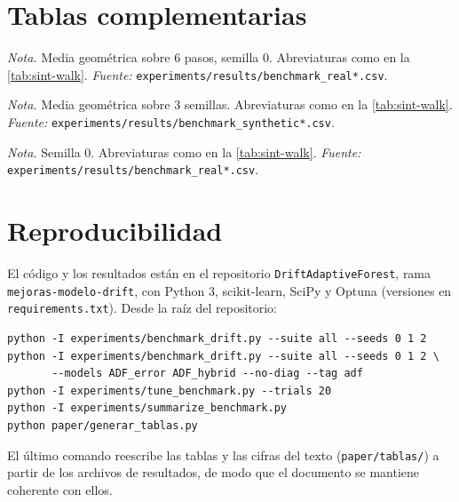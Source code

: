 \documentclass[11pt,a4paper]{article}
\newcommand{\nota}[1]{\par\smallskip\raggedright\footnotesize\textit{Nota.} #1}
\begin{document}
\printbibliography[title={Referencias}]

\appendix
\section{Tablas complementarias}\label{app:tablas}

\begin{table}[htbp]
  \centering
  \caption{Cociente de RMSE respecto al RF convencional, datos reales, walk-forward}\label{tab:real-walk}
  \small
  
  \nota{Media geométrica sobre 6 pasos, semilla 0. Abreviaturas como en la \cref{tab:sint-walk}.
  \textit{Fuente:} \texttt{experiments/results/benchmark\_real*.csv}.}
\end{table}

\begin{table}[htbp]
  \centering
  \caption{Cociente de RMSE respecto al RF convencional, escenarios sintéticos, partición 80/20}\label{tab:sint-static}
  \small
  
  \nota{Media geométrica sobre 3 semillas. Abreviaturas como en la \cref{tab:sint-walk}.
  \textit{Fuente:} \texttt{experiments/results/benchmark\_synthetic*.csv}.}
\end{table}

\begin{table}[htbp]
  \centering
  \caption{Cociente de RMSE respecto al RF convencional, datos reales, partición 80/20}\label{tab:real-static}
  \small
  
  \nota{Semilla 0. Abreviaturas como en la \cref{tab:sint-walk}. \textit{Fuente:}
  \texttt{experiments/results/benchmark\_real*.csv}.}
\end{table}

\section{Reproducibilidad}\label{app:repro}

El código y los resultados están en el repositorio \texttt{DriftAdaptiveForest}, rama
\texttt{mejoras-modelo-drift}, con Python 3, scikit-learn, SciPy y Optuna (versiones en
\texttt{requirements.txt}). Desde la raíz del repositorio:

\begin{verbatim}
python -I experiments/benchmark_drift.py --suite all --seeds 0 1 2
python -I experiments/benchmark_drift.py --suite all --seeds 0 1 2 \
       --models ADF_error ADF_hybrid --no-diag --tag adf
python -I experiments/tune_benchmark.py --trials 20
python -I experiments/summarize_benchmark.py
python paper/generar_tablas.py
\end{verbatim}

El último comando reescribe las tablas y las cifras del texto (\texttt{paper/tablas/}) a partir de
los archivos de resultados, de modo que el documento se mantiene coherente con ellos.
\end{document}
